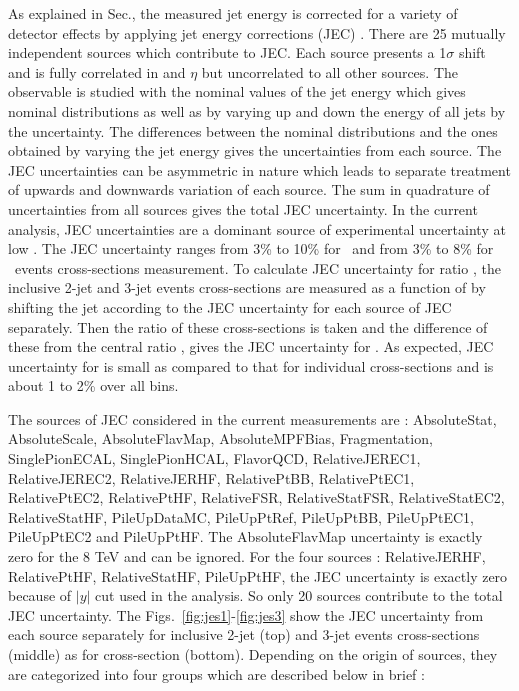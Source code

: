As explained in Sec.\qm, the measured jet energy is corrected for a variety of detector effects by applying jet energy corrections (JEC) \cite{Khachatryan:2016kdb}. There are 25 mutually independent sources which contribute to JEC. Each source presents a 1$\sigma$ shift and is fully correlated in \pt and $\eta$ but uncorrelated to all other sources. The observable is studied with the nominal values of the jet energy which gives nominal distributions as well as by varying up and down the energy of all jets by the uncertainty. The differences between the nominal distributions and the ones obtained by varying the jet energy gives the uncertainties from each source. The JEC uncertainties can be asymmetric in nature which leads to separate treatment of upwards and downwards variation of each source. The sum in quadrature of uncertainties from all sources gives the total JEC uncertainty. In the current analysis, JEC uncertainties are a dominant source of experimental uncertainty at low \httwo. The JEC uncertainty ranges from 3\% to 10\% for \njt~and from 3\% to 8\% for \njth~events cross-sections measurement. To calculate JEC uncertainty for ratio \ratio, the inclusive 2-jet and 3-jet events cross-sections are measured as a function of \httwo by shifting the jet \pt according to the JEC uncertainty for each source of JEC separately. Then the ratio of these cross-sections is taken and the difference of these from the central ratio \ratio, gives the JEC uncertainty for \ratio. As expected, JEC uncertainty for \ratio is small as compared to that for individual cross-sections and is about 1 to 2\% over all \httwo bins.

 The sources of JEC considered in the current measurements are : AbsoluteStat, AbsoluteScale, AbsoluteFlavMap, AbsoluteMPFBias, Fragmentation, SinglePionECAL, SinglePionHCAL, FlavorQCD, RelativeJEREC1, RelativeJEREC2, RelativeJERHF, RelativePtBB, RelativePtEC1, RelativePtEC2, RelativePtHF, RelativeFSR, RelativeStatFSR, RelativeStatEC2, RelativeStatHF, PileUpDataMC, PileUpPtRef, PileUpPtBB, PileUpPtEC1, PileUpPtEC2 and PileUpPtHF. The AbsoluteFlavMap uncertainty is exactly zero for the 8 TeV and can be ignored. For the four sources : RelativeJERHF, RelativePtHF, RelativeStatHF, PileUpPtHF, the JEC uncertainty is exactly zero because of $|y|$  cut used in the analysis. So only 20 sources contribute to the total JEC uncertainty. The Figs.~\ref{fig:jes1}-\ref{fig:jes3} show the JEC uncertainty from each source separately for inclusive 2-jet (top) and 3-jet events cross-sections (middle) as for cross-section \ratio (bottom). Depending on the origin of sources, they are categorized into four groups which are described below in brief :


